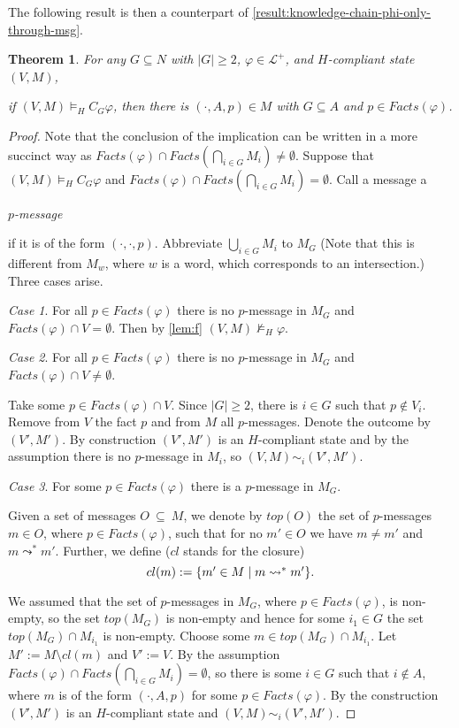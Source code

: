 \documentclass{article}
\newenvironment{mainclaim}{\begin{center}}{\end{center}}
\newcounter{#1}
\newtheorem{theorem}{Theorem}[section]
\newcommand{\oldbfe}[1]{\begin{bfseries}\emph{#1}\end{bfseries}}
\newcommand{\ES}{\mbox{$\emptyset$}}
\newcommand{\sse}{\mbox{$\:\subseteq\:$}}
\newcommand{\NI}{\noindent}
\newcommand{\II}{\vspace{2 mm}}
\newcommand{\state}[1][]{\ensuremath{(V#1,M#1)}\xspace}
\newcommand{\msg}[3]{\ensuremath{(#1,#2,#3)}\xspace}
\newcommand{\ck}[1]{\ensuremath{C_{#1}}\xspace}\newcommand{\Facts}{\mathit{Facts}}
\begin{document}
The following result is then a counterpart of \cref{result:knowledge-chain-phi-only-through-msg}.

\begin{theorem}\label{thm:group1}
For any $G \subseteq N$ with $|G| \geq 2$, $\varphi\in\mathcal{L}^+$, and $H$-compliant state $\state$,
\begin{mainclaim}
if $\state\vDash_H \ck G \varphi$, then there is $\msg{\cdot}{A}{p}\in M$ with $G \subseteq A$ and $p \in Facts(\varphi)$.
\end{mainclaim}
\end{theorem}
\begin{proof}
Note that the conclusion of the implication can be written in a more succinct way as
$Facts(\varphi) \cap \Facts(\bigcap_{i \in G} M_i) \neq \ES$.  
Suppose that $\state\vDash_H \ck G \varphi$ and $Facts(\varphi) \cap \Facts(\bigcap_{i \in G} M_i) = \ES$.  
Call a message a \oldbfe{$p$-message} if it is of the form $(\cdot, \cdot, p)$.
Abbreviate $\bigcup_{i \in G} M_i$ to $M_G$
(Note that this is different from $M_w$, where $w$ is a word,
which corresponds to an intersection.)
Three cases arise.
\II

\NI
\emph{Case 1}. For all $p \in Facts(\varphi)$ there is no $p$-message in $M_G$ and $Facts(\varphi) \cap V = \ES$.
Then by \cref{lem:f} $(V,M) \nvDash_H \varphi$.  
\II

\NI
\emph{Case 2}. For all $p \in Facts(\varphi)$ there is no $p$-message in $M_G$ and $Facts(\varphi) \cap V \neq \ES$.

Take some $p \in Facts(\varphi) \cap V$.
Since $|G| \geq 2$, there is $i \in G$ such that $p \not\in V_{i}$.
Remove from $V$ the fact $p$ and from $M$ all $p$-messages.  Denote
the outcome by $(V', M')$. By construction $(V',M')$ is an  $H$-compliant state and by
the assumption there is no $p$-message in $M_{i}$, so
$(V,M) \sim_i (V',M')$. 
\II

\NI
\emph{Case 3}. For some $p \in Facts(\varphi)$ there is a $p$-message in $M_G$.  

Given a set of messages $O \sse
M$, we denote by $top(O)$ the set of $p$-messages $m \in O$, where $p \in Facts(\varphi)$, such that
for no $m' \in O$ we have $m \neq m'$ and $m \leadsto^* m'$.  Further,
we define ($cl$ stands for the closure)
\[
cl(m) := \mbox{$\{{m' \in M \mid m \leadsto^{*} m'}\}$}.
\]

We assumed that the set of $p$-messages in $M_G$, where $p \in Facts(\varphi)$, is non-empty,
so the set $top(M_G)$ is non-empty and hence for some $i_1 \in G$ the set
$top(M_G) \cap M_{i_1}$ is non-empty. Choose some $m \in top(M_G) \cap M_{i_1}$.
Let $M' := M \setminus cl(m)$ and $V' := V$.  By the assumption 
$Facts(\varphi) \cap \Facts(\bigcap_{i \in G} M_i) = \ES$, so there is some $i \in G$ such that 
$i \not\in A$, where $m$ is of the form $(\cdot,A,p)$ for some $p \in Facts(\varphi)$.
By the construction $(V', M')$ is an $H$-compliant state
and $(V,M) \sim_{i} (V', M')$.  
\II


\end{proof}
\end{document}

